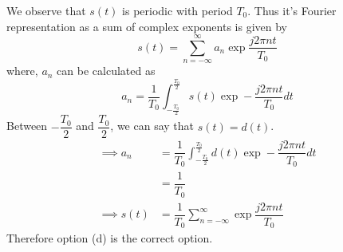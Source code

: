 \documentclass[journal,12pt,twocolumn]{IEEEtran}
\begin{document}
We observe that $s(t)$ is periodic with period $T_0$. Thus it's Fourier representation as a sum of complex exponents is given by
\begin{equation}
    s(t) = \sum_{n=-\infty}^{\infty}a_n\exp\dfrac{j2\pi nt}{T_0}
\end{equation}
where, $a_n$ can be calculated as
\begin{equation}
    a_n = \dfrac{1}{T_0}\int_{-\frac{T_0}{2}}^{\frac{T_0}{2}}s(t)\exp-\dfrac{j2\pi nt}{T_0}dt
\end{equation}
Between $-\dfrac{T_0}{2}$ and $\dfrac{T_0}{2}$, we can say that $s(t) = d(t)$.
\begin{align}
    \implies a_n &= \dfrac{1}{T_0}\int_{-\frac{T_0}{2}}^{\frac{T_0}{2}}d(t)\exp-\dfrac{j2\pi nt}{T_0}dt\\
        &= \dfrac{1}{T_0}\\
    \implies s(t) &= \dfrac{1}{T_0}\sum_{n=-\infty}^{\infty}\exp\dfrac{j2\pi nt}{T_0}
\end{align}
Therefore option (d) is the correct option.
\end{document}
